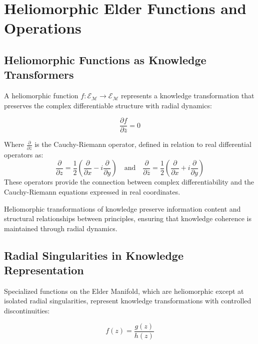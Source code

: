 \section{Heliomorphic Elder Functions and Operations}

\subsection{Heliomorphic Functions as Knowledge Transformers}

A heliomorphic function $f: \mathcal{E}_{\mathcal{M}} \rightarrow \mathcal{E}_{\mathcal{M}}$ represents a knowledge transformation that preserves the complex differentiable structure with radial dynamics:

\begin{equation}
\frac{\partial f}{\partial \overline{z}} = 0
\end{equation}

Where $\frac{\partial}{\partial \overline{z}}$ is the Cauchy-Riemann operator, defined in relation to real differential operators as:
\begin{equation}
\frac{\partial}{\partial z} = \frac{1}{2}\left(\frac{\partial}{\partial x} - i\frac{\partial}{\partial y}\right) \quad \text{and} \quad \frac{\partial}{\partial \overline{z}} = \frac{1}{2}\left(\frac{\partial}{\partial x} + i\frac{\partial}{\partial y}\right)
\end{equation}
These operators provide the connection between complex differentiability and the Cauchy-Riemann equations expressed in real coordinates.

\begin{theorem}
Heliomorphic transformations of knowledge preserve information content and structural relationships between principles, ensuring that knowledge coherence is maintained through radial dynamics.
\end{theorem}

\subsection{Radial Singularities in Knowledge Representation}

Specialized functions on the Elder Manifold, which are heliomorphic except at isolated radial singularities, represent knowledge transformations with controlled discontinuities:

\begin{equation}
f(z) = \frac{g(z)}{h(z)}
\end{equation}

